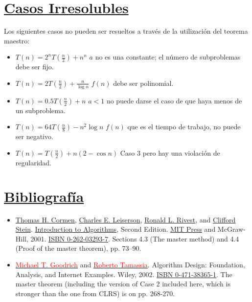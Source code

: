 \documentclass{article}
\begin{document}
	\section[Casos Irresolubles]{\hyperlink{toc}{Casos Irresolubles}}
	\noindent
	Los siguientes casos no pueden ser resueltos a través de la utilización del teorema maestro:\cite{Massachusetts}
	\begin{itemize}[label={$\bullet$}]
		\item $\displaystyle T(n)=2^{n}T\left(\frac{n}{2}\right)+n^{n}$ 
			\newline $a$ no es una constante; el número de subproblemas debe ser fijo.
		\item $\displaystyle T(n)=2T\left(\frac{n}{2}\right)+\frac{n}{\log n}$
		    \newline $f(n)$ debe ser polinomial.
		\item $\displaystyle T(n)=0.5T\left(\frac{n}{2}\right)+n$
		    \newline $a<1$ no puede darse el caso de que haya menos de un subproblema.
		\item $\displaystyle T(n)=64T\left(\frac{n}{8}\right)-n^{2}\log n$
		    \newline $f(n)$ que es el tiempo de trabajo, no puede ser negativo.
		\item $\displaystyle T(n)=T\left(\frac{n}{2}\right)+n(2-\cos n)$
		    \newline Caso 3 pero hay una violación de regularidad.
	\end{itemize}
	\section[Bibliografía]{\hyperlink{toc}{Bibliografía}}
	\begin{itemize}[label={$\bullet$}]
		\item \href{https://es.wikipedia.org/wiki/Thomas_H._Cormen}{Thomas H. Cormen}, \href{https://es.wikipedia.org/wiki/Charles_E._Leiserson}{Charles E. Leiserson}, \href{https://es.wikipedia.org/wiki/Ronald_L._Rivest}{Ronald L. Rivest}, and \href{https://es.wikipedia.org/wiki/Clifford_Stein}{Clifford Stein}. \href{https://es.wikipedia.org/wiki/Introduction_to_Algorithms}{Introduction to Algorithms}, Second Edition. \href{https://es.wikipedia.org/wiki/MIT_Press}{MIT Press} and McGraw-Hill, 2001. \href{https://es.wikipedia.org/wiki/Especial:FuentesDeLibros/0262032937}{ISBN 0-262-03293-7}. Sections 4.3 (The master method) and 4.4 (Proof of the master theorem), pp. 73–90.
		\item \href{https://es.wikipedia.org/w/index.php?title=Michael_T._Goodrich&action=edit&redlink=1}{\textcolor{red}{Michael T. Goodrich}} and \href{https://es.wikipedia.org/w/index.php?title=Roberto_Tamassia&action=edit&redlink=1}{\textcolor{red}{Roberto Tamassia}}. Algorithm Design: Foundation, Analysis, and Internet Examples. Wiley, 2002. \href{https://es.wikipedia.org/wiki/Especial:FuentesDeLibros/0471383651}{ISBN 0-471-38365-1}. The master theorem (including the version of Case 2 included here, which is stronger than the one from CLRS) is on pp. 268-270.
	\end{itemize}
\end{document}
